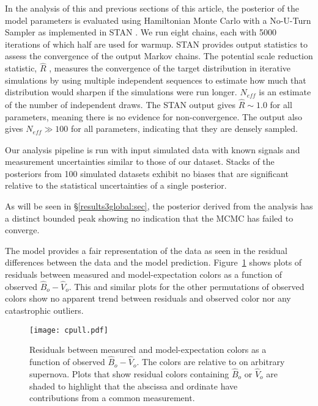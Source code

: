 \documentclass[trackchanges]{aastex62}   	%
\begin{document}
In the analysis of this and previous sections of this article,
the posterior of the model parameters is evaluated using Hamiltonian Monte Carlo with a No-U-Turn
Sampler as implemented in
STAN \citep{JSSv076i01}.  We run eight chains, each with 5000 iterations of which
half are used for warmup.
STAN provides output statistics to assess
the convergence of the output Markov chains.
The 
potential scale reduction statistic, $\hat{R}$
\citep[][in this paragraph not to be confused with the synthetic $\hat{R}$-band magnitude]{Gelman92}, measures the convergence of the target distribution
in iterative simulations 
by using multiple independent sequences to estimate how much that distribution would sharpen if the simulations were run longer.
$N_{\mathit{eff}}$ is an estimate of the number of independent draws. The STAN output gives $\hat{R} \sim 1.0$ for all parameters, meaning there is no evidence for non-convergence.  The
output also gives  $N_{\mathit{eff}} \gg 100$ for all parameters, indicating that they are densely sampled.


Our analysis pipeline is run with input simulated data with known  signals and measurement uncertainties similar to those of our dataset.
Stacks of the posteriors from 100 simulated datasets  exhibit no biases that are significant relative to the statistical uncertainties of a single posterior.

As will be seen in  \S\ref{results3global:sec}, the posterior derived from the analysis has a distinct bounded  
peak showing no indication that the MCMC has failed to converge.

The model provides a fair representation of the data as seen in the residual differences between the data and the model prediction.
Figure~\ref{residual:fig} shows plots of 
residuals between measured and model-expectation colors as a function of observed $\hat{B}_o-\hat{V}_o$.
This and similar plots for the other permutations of observed colors show  no apparent trend between residuals and observed
color nor any catastrophic outliers.

\begin{figure}[htbp] %
   \centering
   \texttt{[image: cpull.pdf]} 
               \caption{
               Residuals between measured and model-expectation colors as a function of observed $\hat{B}_o-\hat{V}_o$.  The colors are
               relative to on arbitrary supernova. Plots that show
               residual
               colors containing $\hat{B}_o$ or $\hat{V}_o$ are shaded to highlight that the abscissa and ordinate have contributions
               from  a common measurement.
            \label{residual:fig}}
\end{figure}
\end{document}
